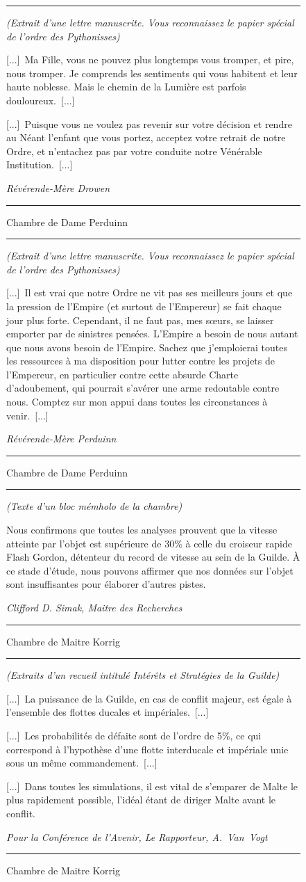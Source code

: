 \documentclass{article}
\newcommand{\newcharacter}{\clearpage\setcounter{figure}{0}}
\newcommand{\indice}[4]{
  \begin{figure}[H]
    \begin{center}
      \rule{0.5\textwidth}{1pt}
    \end{center}
    \begin{framed}
      \begin{samepage}
        \textit{#1}
        \nopagebreak

        #2

        \nopagebreak

        \hfill\textit{#3}
      \end{samepage}
    \end{framed}
    \caption{#4}
    \begin{center}
      \rule{0.5\textwidth}{1pt}
    \end{center}
  \end{figure}
}
\begin{document}
\indice
{(Extrait d'une lettre manuscrite. Vous reconnaissez le papier spécial de
l'ordre des Pythonisses)}
{
    [...]~Ma Fille, vous ne pouvez plus longtemps vous tromper, et pire, nous
    tromper. Je comprends les sentiments qui vous habitent et leur haute
    noblesse. Mais le chemin de la Lumière est parfois douloureux.~[...]

    \nobreak

    [...]~Puisque vous ne voulez pas revenir sur votre décision et rendre au
    Néant l'enfant que vous portez, acceptez votre retrait de notre Ordre, et
    n'entachez pas par votre conduite notre Vénérable Institution.~[...]
}{Révérende-Mère Drowen}
{Chambre de Dame Perduinn}

\indice
{(Extrait d'une lettre manuscrite. Vous reconnaissez le papier spécial de
l'ordre des Pythonisses)}
{
    [...]~Il est vrai que notre Ordre ne vit pas ses meilleurs jours et que la
    pression de l'Empire (et surtout de l'Empereur) se fait chaque jour plus
    forte. Cependant, il ne faut pas, mes sœurs, se laisser emporter par de
    sinistres pensées. L'Empire a besoin de nous autant que nous avons besoin
    de l'Empire. Sachez que j'emploierai toutes les ressources à ma disposition
    pour lutter contre les projets de l'Empereur, en particulier contre cette
    absurde \og Charte d'adoubement\fg{}, qui pourrait s'avérer une arme
    redoutable contre nous. Comptez sur mon appui dans toutes les circonstances
    à venir.~[...]
}{Révérende-Mère Perduinn}
{Chambre de Dame Perduinn}

\newcharacter

\indice
{(Texte d'un bloc mémholo de la chambre)}
{
    Nous confirmons que toutes les analyses prouvent que la vitesse atteinte
    par l'objet est supérieure de 30\% à celle du croiseur rapide Flash Gordon,
    détenteur du record de vitesse au sein de la Guilde. À ce stade d'étude,
    nous pouvons affirmer que nos données sur l'objet sont insuffisantes pour
    élaborer d'autres pistes.
}{Clifford D. Simak, Maitre des Recherches}
{Chambre de Maitre Korrig}

\indice
{(Extraits d'un recueil intitulé \textit{Intérêts et Stratégies de la Guilde})}
{
    [...]~La puissance de la Guilde, en cas de conflit majeur, est égale à
    l'ensemble des flottes ducales et impériales.~[...]

    \nobreak

    [...]~Les probabilités de défaite sont de l'ordre de 5\%, ce qui
    correspond à l'hypothèse d'une flotte interducale et impériale unie sous un
    même commandement.~[...]

    \nobreak

    [...]~Dans toutes les simulations, il est vital de s'emparer de Malte le
    plus rapidement possible, l'idéal étant de diriger Malte avant le conflit.
}{Pour la Conférence de l'Avenir, Le Rapporteur, A.~Van~Vogt}
{Chambre de Maitre Korrig}
\end{document}

